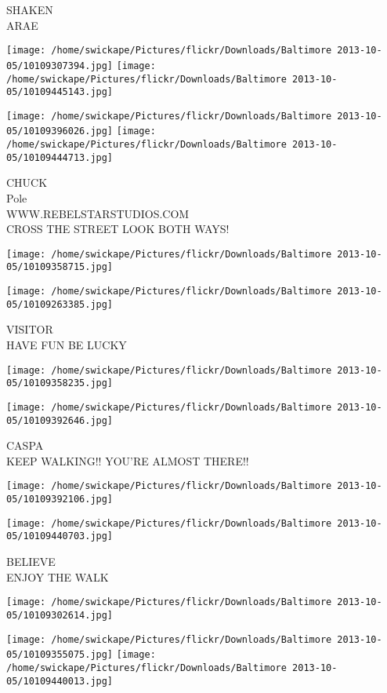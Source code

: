\documentclass[10pt,letterpaper]{article}
\begin{document}
SHAKEN\\
ARAE
\pagebreak

\texttt{[image: /home/swickape/Pictures/flickr/Downloads/Baltimore 2013-10-05/10109307394.jpg]}
\texttt{[image: /home/swickape/Pictures/flickr/Downloads/Baltimore 2013-10-05/10109445143.jpg]}

\texttt{[image: /home/swickape/Pictures/flickr/Downloads/Baltimore 2013-10-05/10109396026.jpg]}
\texttt{[image: /home/swickape/Pictures/flickr/Downloads/Baltimore 2013-10-05/10109444713.jpg]}

CHUCK\\
Pole\\
WWW.REBELSTARSTUDIOS.COM\\
CROSS THE STREET LOOK BOTH WAYS!
\pagebreak

\texttt{[image: /home/swickape/Pictures/flickr/Downloads/Baltimore 2013-10-05/10109358715.jpg]}

\vspace{0.25in}
\texttt{[image: /home/swickape/Pictures/flickr/Downloads/Baltimore 2013-10-05/10109263385.jpg]}

VISITOR\\
HAVE FUN BE LUCKY
\pagebreak

\texttt{[image: /home/swickape/Pictures/flickr/Downloads/Baltimore 2013-10-05/10109358235.jpg]}

\vspace{0.25in}
\texttt{[image: /home/swickape/Pictures/flickr/Downloads/Baltimore 2013-10-05/10109392646.jpg]}

CASPA\\
KEEP WALKING!! YOU'RE ALMOST THERE!!
\pagebreak

\texttt{[image: /home/swickape/Pictures/flickr/Downloads/Baltimore 2013-10-05/10109392106.jpg]}

\vspace{0.25in}
\texttt{[image: /home/swickape/Pictures/flickr/Downloads/Baltimore 2013-10-05/10109440703.jpg]}

BELIEVE\\
ENJOY THE WALK
\pagebreak

\texttt{[image: /home/swickape/Pictures/flickr/Downloads/Baltimore 2013-10-05/10109302614.jpg]}

\vspace{0.25in}
\texttt{[image: /home/swickape/Pictures/flickr/Downloads/Baltimore 2013-10-05/10109355075.jpg]}
\texttt{[image: /home/swickape/Pictures/flickr/Downloads/Baltimore 2013-10-05/10109440013.jpg]}
\end{document}
